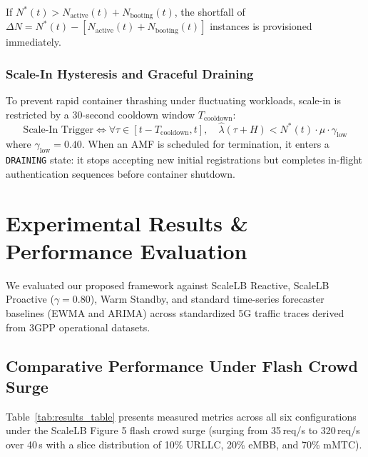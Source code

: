 \documentclass[conference]{IEEEtran}
\begin{document}
If $N^*(t) > N_{\text{active}}(t) + N_{\text{booting}}(t)$, the shortfall of $\Delta N = N^*(t) - [N_{\text{active}}(t) + N_{\text{booting}}(t)]$ instances is provisioned immediately.

\subsubsection{Scale-In Hysteresis and Graceful Draining}
To prevent rapid container thrashing under fluctuating workloads, scale-in is restricted by a 30-second cooldown window $T_{\text{cooldown}}$:
\begin{equation}
\text{Scale-In Trigger} \iff \forall \tau \in [t - T_{\text{cooldown}}, t], \quad \hat{\lambda}(\tau + H) < N^*(t) \cdot \mu \cdot \gamma_{\text{low}}
\end{equation}
where $\gamma_{\text{low}} = 0.40$. When an AMF is scheduled for termination, it enters a \texttt{DRAINING} state: it stops accepting new initial registrations but completes in-flight authentication sequences before container shutdown.

\section{Experimental Results \& Performance Evaluation}

We evaluated our proposed framework against ScaleLB Reactive, ScaleLB Proactive ($\gamma = 0.80$), Warm Standby, and standard time-series forecaster baselines (EWMA and ARIMA) across standardized 5G traffic traces derived from 3GPP operational datasets.

\subsection{Comparative Performance Under Flash Crowd Surge}
Table~\ref{tab:results_table} presents measured metrics across all six configurations under the ScaleLB Figure 5 flash crowd surge (surging from 35\,req/s to 320\,req/s over 40\,s with a slice distribution of 10\% URLLC, 20\% eMBB, and 70\% mMTC).
\end{document}
